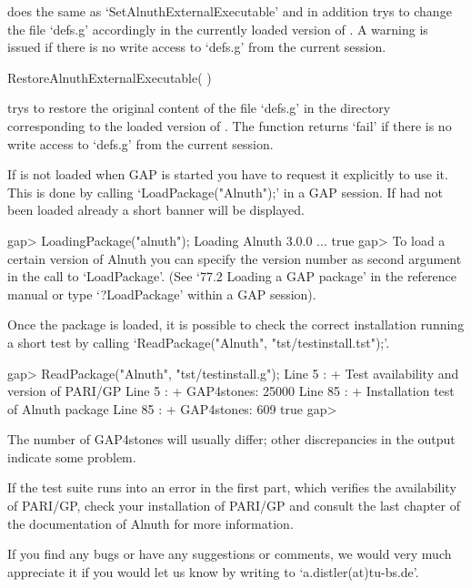 does the same as `SetAlnuthExternalExecutable' and in addition trys to
change the file `defs.g' accordingly in the currently loaded version
of {\Alnuth}. A warning is issued if there is no write access to `defs.g'
from the current {\GAP} session.

\> RestoreAlnuthExternalExecutable( )

trys to restore the original content of the file `defs.g' in the
directory corresponding to the loaded version of {\Alnuth}. The function
returns `fail' if there is no write access to `defs.g'
from the current {\GAP} session.


If {\Alnuth} is not loaded when GAP is started you have to request it
explicitly to use it. This is done by calling `LoadPackage("Alnuth");'
in a GAP session. If {\Alnuth} had not been loaded already a short
banner will be displayed.

\beginexample
    gap> LoadingPackage("alnuth");
    Loading Alnuth 3.0.0 ...
    true
    gap>
\endexample
To load a certain version of Alnuth you can specify the version number as
second argument in the call to `LoadPackage'. (See `77.2 Loading a GAP
package' in the reference manual or type `?LoadPackage' within a GAP session).

Once the package is loaded, it is possible to check the correct installation
running a short test by calling `ReadPackage("Alnuth",
"tst/testinstall.tst");'.

\beginexample
    gap> ReadPackage("Alnuth", "tst/testinstall.g");
    Line 5 :
    + Test availability and version of PARI/GP
    Line 5 :
    + GAP4stones: 25000
    Line 85 :
    + Installation test of Alnuth package
    Line 85 :
    + GAP4stones: 609
    true
    gap>
\endexample

The number of GAP4stones will usually differ; other discrepancies in the 
output indicate some problem.

If the test suite runs into an error in the first part, which verifies the
availability of PARI/GP, check your installation of PARI/GP and consult the
last chapter of the documentation of Alnuth for more information.

If you find any bugs or have any suggestions or comments, we would very much
appreciate it if you would let us know by writing to `a.distler(at)tu-bs.de'.

